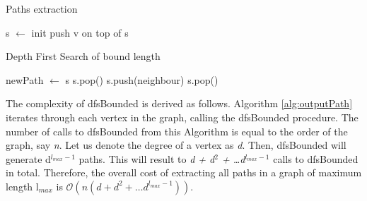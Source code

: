 \documentclass{l4proj}
\begin{document}
\begin{algorithm}
\centering
\caption{Paths extraction}
\label{alg:generatePath}
\begin{algorithmic}[1]
	\State s $\gets$ init 
	\State push v on top of s
	\State {}
\EndFor
\EndProcedure
\end{algorithmic}
\end{algorithm}

\begin{algorithm}
\centering
\caption{Depth First Search of bound length}
\label{alg:dfsBounded}
\begin{algorithmic}[1]
\State newPath  $\gets$ s  
\State {}
\EndIf
{}
\State s.pop()
\EndIf
{}
\State s.push(neighbour)
\State {} 
\EndIf
\EndFor
{} 
\State s.pop()
\EndIf
\EndProcedure
\end{algorithmic}
\end{algorithm}
 
The complexity of dfsBounded is derived as follows. Algorithm \ref{alg:outputPath} iterates through each vertex in the graph, calling the dfsBounded procedure. The number of calls to dfsBounded from this Algorithm is equal to the order of the graph, say \emph{n}. Let us denote the degree of a vertex as \emph{d}. Then, dfsBounded will generate d$^{l_{max}-1}$ paths. This will result to \emph{d + d$^{2}$ + \ldots d$^{l_{max}-1}$} calls to dfsBounded in total. Therefore, the overall cost of extracting all paths in a graph of maximum length l$_{max}$ is $\mathcal{O}(n(d + d^{2} + \ldots d^{l_{max}-1}))$.
\end{document}
